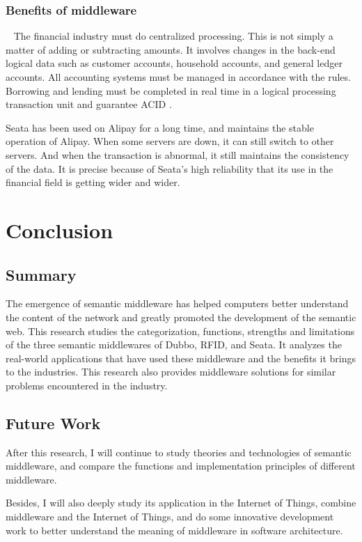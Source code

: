 \documentclass[conference]{IEEEtran}
\begin{document}
\subsubsection{Benefits of middleware}
\
\newline
\indent
The financial industry must do centralized processing. This is not simply a matter of adding or subtracting amounts. It involves changes in the back-end logical data such as customer accounts, household accounts, and general ledger accounts. All accounting systems must be managed in accordance with the rules. Borrowing and lending must be completed in real time in a logical processing transaction unit and guarantee ACID \cite{b15}.

Seata has been used on Alipay for a long time, and maintains the stable operation of Alipay. When some servers are down, it can still switch to other servers. And when the transaction is abnormal, it still maintains the consistency of the data. It is precise because of Seata's high reliability that its use in the financial field is getting wider and wider.


\section{Conclusion}

\subsection{Summary}
The emergence of semantic middleware has helped computers better understand the content of the network and greatly promoted the development of the semantic web. This research studies the categorization, functions, strengths and limitations of the three semantic middlewares of Dubbo, RFID, and Seata. It analyzes the real-world applications that have used these middleware and the benefits it brings to the industries. This research also provides middleware solutions for similar problems encountered in the industry.


\subsection{Future Work}
After this research, I will continue to study theories and technologies of semantic middleware, and compare the functions and implementation principles of different middleware.

Besides, I will also deeply study its application in the Internet of Things, combine middleware and the Internet of Things, and do some innovative development work to better understand the meaning of middleware in software architecture.
\end{document}
